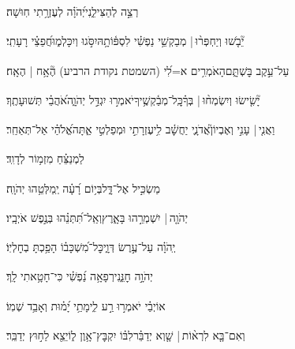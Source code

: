 \documentclass[12pt]{article}
\newcommand{\loc}[1]{\textsuperscript{\locf{#1}}}
\begin{document}
{\loc{ יד}~}‏רְצֵ֣ה  לְהַצִּילֵ֑נִי{\hfill}יְ֝הֹוָ֗ה לְעֶזְרָ֥תִי חֽוּשָׁה׃\par

{\loc{ טו}~}‏יֵ֘בֹ֤שׁוּ וְיַחְפְּר֨וּ |  {\hfill}מְבַקְשֵׁ֥י נַפְשִׁ֗י לִסְפּ֫וֹתָ֥הּ\newline\hspace*{.5em}יִסֹּ֣גוּ  וְיִכָּלְמ֑וּ{\hfill}חֲ֝פֵצֵ֗י רָעָתִֽי׃\par

{\loc{ טז}~}‏ עַל־עֵ֣קֶב בׇּשְׁתָּ֑ם{\hfill}הָאֹמְרִ֥ים א=לִ֝י (השמטת נקודת הרביע) הֶ֘אָ֥ח | הֶאָֽח׃\par

{\loc{ יז}~}‏יָ֘שִׂ֤ישׂוּ וְיִשְׂמְח֨וּ |  בְּךָ֗{\hfill}כׇּֽל־מְבַ֫קְשֶׁ֥יךָ\newline\hspace*{.5em}יֹאמְר֣וּ  יִגְדַּ֣ל יְהֹוָ֑ה{\hfill}אֹ֝הֲבֵ֗י תְּשׁוּעָתֶֽךָ׃\par

{\loc{ יח}~}‏וַאֲנִ֤י |  עָנִ֣י וְאֶבְיוֹן֮{\hfill}אֲדֹנָ֢י יַחֲשׇׁ֫ב לִ֥י\newline\hspace*{.5em}עֶזְרָתִ֣י וּמְפַלְטִ֣י אַ֑תָּה{\hfill}אֱ֝לֹהַ֗י אַל־תְּאַחַֽר׃\par\pend

\pstart[\subsection*{\textcolor{red}{פרק מא}}]\label{פרק מא}
{\loc{ א}~}‏לַמְנַצֵּ֗חַ מִזְמ֥וֹר לְדָוִֽד׃\par

{\loc{ ב}~}‏ מַשְׂכִּ֣יל אֶל־דָּ֑ל{\hfill}בְּי֥וֹם רָ֝עָ֗ה יְֽמַלְּטֵ֥הוּ יְהֹוָֽה׃\par

{\loc{ ג}~}‏יְהֹוָ֤ה |  יִשְׁמְרֵ֣הוּ   בָּאָ֑רֶץ{\hfill}וְאַֽל־תִּ֝תְּנֵ֗הוּ בְּנֶ֣פֶשׁ אֹיְבָֽיו׃\par

{\loc{ ד}~}‏יְֽהֹוָ֗ה  עַל־עֶ֣רֶשׂ דְּוָ֑י{\hfill}כׇּל־מִ֝שְׁכָּב֗וֹ הָפַ֥כְתָּ בְחׇלְיֽוֹ׃\par

{\loc{ ה}~}‏ יְהֹוָ֣ה חׇנֵּ֑נִי{\hfill}רְפָאָ֥ה נַ֝פְשִׁ֗י כִּי־חָטָ֥אתִי לָֽךְ׃\par

{\loc{ ו}~}‏אוֹיְבַ֗י יֹאמְר֣וּ רַ֣ע לִ֑י{\hfill}מָתַ֥י יָ֝מ֗וּת וְאָבַ֥ד שְׁמֽוֹ׃\par

{\loc{ ז}~}‏וְאִם־בָּ֤א לִרְא֨וֹת |  שָׁ֤וְא יְדַבֵּ֗ר{\hfill}לִבּ֗וֹ יִקְבׇּץ־אָ֥וֶן ל֑וֹ\newline\hspace*{.5em}יֵצֵ֖א לַח֣וּץ יְדַבֵּֽר׃\par
\end{document}
